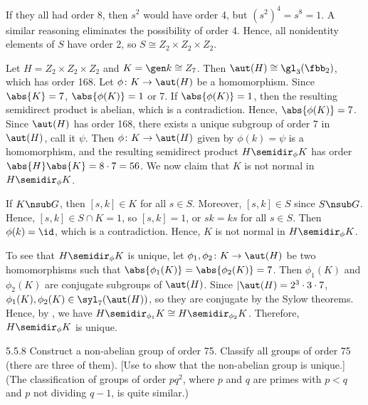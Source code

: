 \begin{solenum}
    If they all had order 8, then $s^2$ would have order 4, but $(s^2)^4 = s^8 = 1$.
	A similar reasoning eliminates the possibility of order 4.
	Hence, all nonidentity elements of $S$ have order 2, so $S \cong Z_2 \times Z_2 \times Z_2$.
    \item Let $H = Z_2 \times Z_2 \times Z_2$ and $K = \gen k \cong Z_7$.
	Then $\aut(H) \cong \gl_3(\fbb_2)$, which has order 168.
	Let $\phi \colon K \to \aut(H)$ be a homomorphism.
	Since $\abs{K} = 7$, $\abs{\phi(K)} = 1$ or 7.
	If $\abs{\phi(K)} = 1$, then the resulting semidirect product is abelian, which is a contradiction.
	Hence, $\abs{\phi(K)} = 7$.
	Since $\aut(H)$ has order 168, there exists a unique subgroup of order 7 in $\aut(H)$, call it $\psi$.
	Then $\phi \colon K \to \aut(H)$ given by $\phi(k) = \psi$ is a homomorphism, and the resulting semidirect product $H \semidir_\phi K$ has order $\abs{H}\abs{K} = 8 \cdot 7 = 56$.
	We now claim that $K$ is not normal in $H \semidir_\phi K$.
    
    If $K \nsub G$, then $[s, k] \in K$ for all $s \in S$.
	Moreover, $[s, k] \in S$ since $S \nsub G$.
	Hence, $[s, k] \in S \cap K = 1$, so $[s, k] = 1$, or $sk = ks$ for all $s \in S$.
	Then $\phi(k) = \id$, which is a contradiction.
	Hence, $K$ is not normal in $H \semidir_\phi K$.

    To see that $H \semidir_\phi K$ is unique, let $\phi_1, \phi_2 \colon K \to \aut(H)$ be two homomorphisms such that $\abs{\phi_1(K)} = \abs{\phi_2(K)} = 7$.
	Then $\phi_1(K)$ and $\phi_2(K)$ are conjugate subgroups of $\aut(H)$.
	Since $|\aut(H) = 2^3 \cdot 3 \cdot 7$, $\phi_1(K), \phi_2(K) \in \syl_7(\aut(H))$, so they are conjugate by the Sylow theorems.
	Hence, by , we have $H \semidir_{\phi_1} K \cong H \semidir_{\phi_2} K$.
	Therefore, $H \semidir_\phi K$ is unique.
\end{solenum}

\begin{exercise}{5.5.8}
    Construct a non-abelian group of order 75.
	Classify all groups of order 75 (there are three of them). [Use  to show that the non-abelian group is unique.] (The classification of groups of order $pq^2$, where $p$ and $q$ are primes with $p < q$ and $p$ not dividing $q - 1$, is quite similar.)
\end{exercise}

